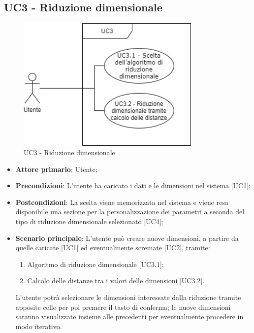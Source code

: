 \subsection{UC3 - Riduzione dimensionale}
\begin{figure}[h]
\includegraphics[width=9cm]{section/Images/UC3.png}
\centering
\caption{UC3 - Riduzione dimensionale}
\end{figure}
\begin{itemize}
	\item \textbf{Attore primario}: Utente;
	\item \textbf{Precondizioni}: L'utente ha caricato i dati e le dimensioni nel sistema [UC1];
	\item \textbf{Postcondizioni}: La scelta viene memorizzata nel sistema e viene resa disponibile una sezione per la personalizzazione dei parametri a seconda del tipo di riduzione dimensionale selezionato [UC4];
	\item \textbf{Scenario principale}: L'utente può creare nuove dimensioni, a partire da quelle caricate [UC1] ed eventualmente scremate [UC2], tramite:
	\begin{enumerate}[1.]
		\item Algoritmo di riduzione dimensionale [UC3.1];
		\item Calcolo delle distanze tra i valori delle dimensioni [UC3.2].
	\end{enumerate}
	L'utente potrà selezionare le dimensioni interessate dalla riduzione tramite apposite celle per poi premere il tasto di conferma; le nuove dimensioni saranno visualizzate insieme alle precedenti per eventualmente procedere in modo iterativo.
\end{itemize}